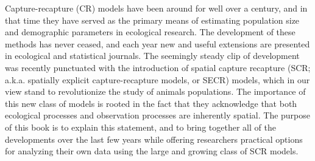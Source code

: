 \begin{comment}
\begin{verbatim}
"A preface or foreword deals with the genesis, purpose, limitations,
and scope of the book and may include acknowledgments of indebtedness;

an introduction deals with the subject of the book, supplementing and
introducing the text and indicating a point of view to be adopted by
the reader. The introduction usually forms a part of the text [and the
text numbering system]; the preface does not." (In other words, the
arabic numbering of the book (1,2,3) starts with the introduction, if
there is one. The other front matter takes i, ii, iii, etc.)
\end{verbatim}
\end{comment}

\begin{comment}
RS:
According to what we discussed a few days ago, the 4 big blocks of the Preface should be
1. Why are we writing this book?
2. What are the themes?
3. Software/computing/modeling - something about the practical aspects
4. Organization of the book
I tried commenting on the below material referring to this overall organization we agreed on.
\end{comment}




Capture-recapture (CR) models have been around for well
over a century, and in that time they have served as the primary means of
estimating population size and demographic parameters in ecological
research. The development of these methods has never ceased, and
each year new and useful extensions are presented in ecological and
statistical journals. The seemingly steady clip of development was
recently punctuated with the introduction of spatial capture
recapture (SCR; a.k.a.  spatially explicit capture-recapture models, or SECR)
 models, which in our view stand to revolutionize the
study of animals populations. The importance of this new class of
models is rooted in the fact that they acknowledge that both
ecological processes and observation processes are inherently
spatial. The purpose of this book is to explain this statement, and
to bring together all of the developments over the last few years
while offering researchers practical options for analyzing their own
data using the large and growing class of SCR models.

